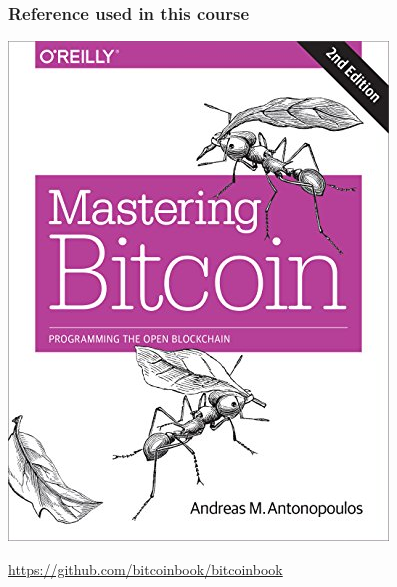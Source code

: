 \documentclass[11pt]{beamer}  %
\begin{document}
\begin{frame}\frametitle{Reference used in this course}

  \begin{center}
    \includegraphics[scale=.35,clip=false]{pictures/mastering-bitcoin.jpg}
  \end{center}

  \begin{center}
    \url{https://github.com/bitcoinbook/bitcoinbook}
  \end{center}

\end{frame}
\end{document}
